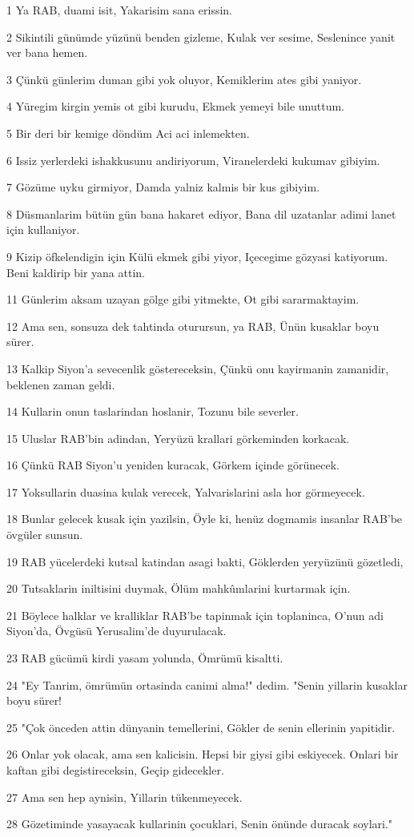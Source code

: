 \par 1 Ya RAB, duami isit, Yakarisim sana erissin.
\par 2 Sikintili günümde yüzünü benden gizleme, Kulak ver sesime, Seslenince yanit ver bana hemen.
\par 3 Çünkü günlerim duman gibi yok oluyor, Kemiklerim ates gibi yaniyor.
\par 4 Yüregim kirgin yemis ot gibi kurudu, Ekmek yemeyi bile unuttum.
\par 5 Bir deri bir kemige döndüm Aci aci inlemekten.
\par 6 Issiz yerlerdeki ishakkusunu andiriyorum, Viranelerdeki kukumav gibiyim.
\par 7 Gözüme uyku girmiyor, Damda yalniz kalmis bir kus gibiyim.
\par 8 Düsmanlarim bütün gün bana hakaret ediyor, Bana dil uzatanlar adimi lanet için kullaniyor.
\par 9 Kizip öfkelendigin için Külü ekmek gibi yiyor, Içecegime gözyasi katiyorum. Beni kaldirip bir yana attin.
\par 11 Günlerim aksam uzayan gölge gibi yitmekte, Ot gibi sararmaktayim.
\par 12 Ama sen, sonsuza dek tahtinda oturursun, ya RAB, Ünün kusaklar boyu sürer.
\par 13 Kalkip Siyon'a sevecenlik göstereceksin, Çünkü onu kayirmanin zamanidir, beklenen zaman geldi.
\par 14 Kullarin onun taslarindan hoslanir, Tozunu bile severler.
\par 15 Uluslar RAB'bin adindan, Yeryüzü krallari görkeminden korkacak.
\par 16 Çünkü RAB Siyon'u yeniden kuracak, Görkem içinde görünecek.
\par 17 Yoksullarin duasina kulak verecek, Yalvarislarini asla hor görmeyecek.
\par 18 Bunlar gelecek kusak için yazilsin, Öyle ki, henüz dogmamis insanlar RAB'be övgüler sunsun.
\par 19 RAB yücelerdeki kutsal katindan asagi bakti, Göklerden yeryüzünü gözetledi,
\par 20 Tutsaklarin iniltisini duymak, Ölüm mahkûmlarini kurtarmak için.
\par 21 Böylece halklar ve kralliklar RAB'be tapinmak için toplaninca, O'nun adi Siyon'da, Övgüsü Yerusalim'de duyurulacak.
\par 23 RAB gücümü kirdi yasam yolunda, Ömrümü kisaltti.
\par 24 "Ey Tanrim, ömrümün ortasinda canimi alma!" dedim. "Senin yillarin kusaklar boyu sürer!
\par 25 "Çok önceden attin dünyanin temellerini, Gökler de senin ellerinin yapitidir.
\par 26 Onlar yok olacak, ama sen kalicisin. Hepsi bir giysi gibi eskiyecek. Onlari bir kaftan gibi degistireceksin, Geçip gidecekler.
\par 27 Ama sen hep aynisin, Yillarin tükenmeyecek.
\par 28 Gözetiminde yasayacak kullarinin çocuklari, Senin önünde duracak soylari."

